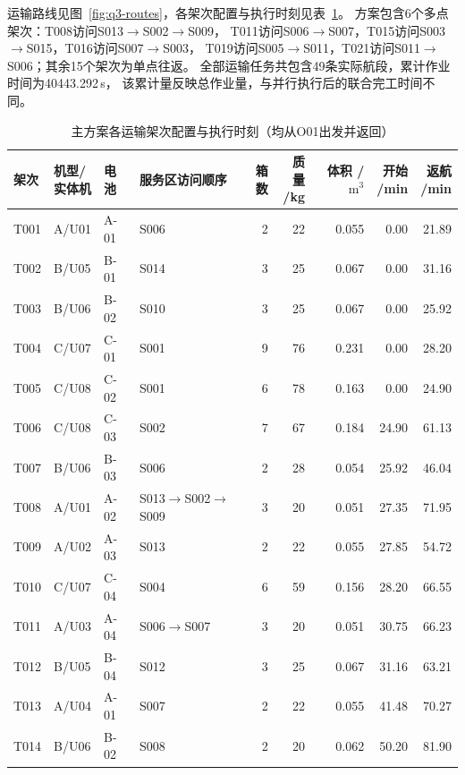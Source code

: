 运输路线见图~\ref{fig:q3-routes}，各架次配置与执行时刻见表~\ref{tab:q3-sorties}。
方案包含6个多点架次：T008访问S013$\to$S002$\to$S009，
T011访问S006$\to$S007，T015访问S003$\to$S015，T016访问S007$\to$S003，
T019访问S005$\to$S011，T021访问S011$\to$S006；其余15个架次为单点往返。
全部运输任务共包含49条实际航段，累计作业时间为40443.292\,s，
该累计量反映总作业量，与并行执行后的联合完工时间不同。
\begin{table}[!htbp]
\centering
\footnotesize
\setlength{\tabcolsep}{3pt}
\renewcommand{\arraystretch}{1.10}
\caption{主方案各运输架次配置与执行时刻（均从O01出发并返回）}\label{tab:q3-sorties}
\begin{tabular}{@{}lll lrrrrr@{}}
\toprule
架次 & \shortstack{机型/\\实体机} & 电池 & 服务区访问顺序 & 箱数 & \shortstack{质量\\/kg} & \shortstack{体积\\/$\mathrm{m^3}$} & \shortstack{开始\\/min} & \shortstack{返航\\/min} \\
\midrule
T001 & A/U01 & A-01 & S006 & 2 & 22 & 0.055 & 0.00 & 21.89 \\
T002 & B/U05 & B-01 & S014 & 3 & 25 & 0.067 & 0.00 & 31.16 \\
T003 & B/U06 & B-02 & S010 & 3 & 25 & 0.067 & 0.00 & 25.92 \\
T004 & C/U07 & C-01 & S001 & 9 & 76 & 0.231 & 0.00 & 28.20 \\
T005 & C/U08 & C-02 & S001 & 6 & 78 & 0.163 & 0.00 & 24.90 \\
T006 & C/U08 & C-03 & S002 & 7 & 67 & 0.184 & 24.90 & 61.13 \\
T007 & B/U06 & B-03 & S006 & 2 & 28 & 0.054 & 25.92 & 46.04 \\
T008 & A/U01 & A-02 & S013$\to$S002$\to$S009 & 3 & 20 & 0.051 & 27.35 & 71.95 \\
T009 & A/U02 & A-03 & S013 & 2 & 22 & 0.055 & 27.85 & 54.72 \\
T010 & C/U07 & C-04 & S004 & 6 & 59 & 0.156 & 28.20 & 66.55 \\
T011 & A/U03 & A-04 & S006$\to$S007 & 3 & 20 & 0.051 & 30.75 & 66.23 \\
T012 & B/U05 & B-04 & S012 & 3 & 25 & 0.067 & 31.16 & 63.21 \\
T013 & A/U04 & A-01 & S007 & 2 & 22 & 0.055 & 41.48 & 70.27 \\
T014 & B/U06 & B-02 & S008 & 2 & 20 & 0.062 & 50.20 & 81.90 \\

\end{tabular}
\end{table}
